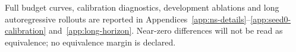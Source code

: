  Full budget curves, calibration diagnostics, development ablations and long autoregressive rollouts are reported in Appendices~\ref{app:ns-details}--\ref{app:seed0-calibration} and~\ref{app:long-horizon}. Near-zero differences will not be read as equivalence; no equivalence margin is declared.
